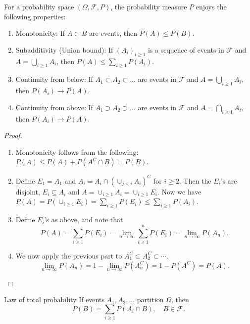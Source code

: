 \begin{thrm}{}{}
For a probability space \( (\Omega , \mathcal{F} ,P) \), the probability measure \( P \) enjoys the following properties:
\begin{enumerate}[label=\emph{\roman*.)}]
    \item Monotonicity: If \( A \subset B \) are events, then \( P(A) \leq P(B) \). 
    \item Subadditivity (Union bound): If \( (A_{i} )_{i\geq 1} \) is a sequence of events in \( \mathcal{F}  \) and \( A = \bigcup_{i\geq 1}A_{i}   \), then \( P(A) \leq \sum_{i\geq 1}P(A_{i} )  \). 
    \item Continuity from below: If \( A_1 \subset A_2 \subset  \dots  \) are events in \( \mathcal{F}  \) and \( A = \bigcup_{i\geq 1} A_{i} \), then \( P(A_{i} )  \to  P(A) \). 
    \item Continuity from above: If \( A_1 \supset A_2 \supset \dots  \) are events in \( \mathcal{F}  \) and \( A = \bigcap_{i\geq 1} A_{i}  \), then \( P(A_{i} ) \to  P(A) \). 
\end{enumerate} 
    \tcbline
\begin{proof}
    \quad
    \newline
\begin{enumerate}[label = \emph{\roman*.)}]
    \item Monotonicity follows from the following: \( P(A)\leq P(A) + P(A^{C} \cap B) = P(B) \). 
    \item Define \( E_1 = A_1 \) and \( A_{i}  = A_{i} \cap (\cup _{j<i}A_{i} )^{C}  \) for \( i\geq 2 \). Then the \( E_{i}  \)'s are disjoint, \( E_{i} \subseteq A_{i}  \) and \( A = \cup _{i\geq 1}A_{i} = \cup _{i\geq 1}E_{i}  \). Now we have \( P(A) = P(\cup _{i\geq 1}E_{i} )= \sum_{i\geq 1}P(E_{i} )\leq \sum_{i\geq 1}P(A_{i} )   \).
    \item Define \( E_{i}  \)'s as above, and note that 
    \[
        P(A) = \sum_{i\geq 1}P(E_{i}) = \lim_{n \to \infty} \sum_{i\geq 1}^{n}P(E_{i} ) = \lim_{n \to \infty} P(A_{n} ).
    \]
    \item We now apply the previous part to \( A_{1}^{C} \subset A_2 ^{C} \subset \cdots   \). 
    \[
        \lim_{n \to \infty} P(A_{n} ) = 1 - \lim_{n \to \infty} P(A_{n} ^{C} ) = 1 - P(A ^{C} )= P(A).
    \]
\end{enumerate}
\end{proof}

\end{thrm}

\begin{thrm}{Law of total probability}{}
If events \( A_1, A_2,\dots  \) partition \( \Omega  \), then 
\[
    P(B) = \sum_{i\geq 1} P(A_{i} \cap B), \quad B \in \mathcal{F} .
\]
\end{thrm}

